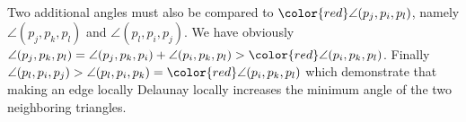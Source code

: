 \documentclass{article}
\begin{document}
Two additional angles must also be compared to
$\color{red}\angle(p_j,p_i,p_l)$, namely
$\angle(p_j,p_k,p_l)$
and
$\angle(p_l,p_i,p_j)$.
We have obviously $\angle(p_j,p_k,p_l) = \angle(p_j,p_k,p_i)+\angle(p_i,p_k,p_l) > {\color{red} \angle(p_i,p_k,p_l)}$.
Finally $\angle(p_l,p_i,p_j) > \angle(p_l,p_i,p_k) = {\color{red}\angle(p_i,p_k,p_l)}$ which
demonstrate that making an edge locally Delaunay locally increases the
minimum angle of the two neighboring triangles.





\end{document}

